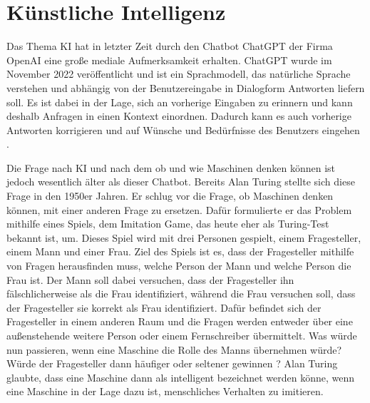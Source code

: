 \section{Künstliche Intelligenz}
\label{chap:KI}

Das Thema \ac{KI} hat in letzter Zeit durch den Chatbot ChatGPT der Firma OpenAI eine große mediale Aufmerksamkeit erhalten. 
ChatGPT wurde im November 2022 veröffentlicht und ist ein Sprachmodell, das natürliche Sprache verstehen und abhängig von der 
Benutzereingabe in Dialogform Antworten liefern soll. Es ist dabei in der Lage, sich an vorherige Eingaben zu erinnern und kann 
deshalb Anfragen in einen Kontext einordnen. Dadurch kann es auch vorherige Antworten korrigieren und auf Wünsche und Bedürfnisse 
des Benutzers eingehen \cite[]{CHATGPT}. 

Die Frage nach \ac{KI} und nach dem ob und wie Maschinen denken können ist jedoch wesentlich älter als dieser Chatbot. 
Bereits Alan Turing stellte sich diese Frage in den 1950er Jahren. Er schlug vor die Frage, ob Maschinen denken können,
mit einer anderen Frage zu ersetzen. Dafür formulierte er das Problem mithilfe eines Spiels, dem \glqq Imitation Game\grqq, 
das heute eher als Turing-Test bekannt ist, um. Dieses Spiel wird mit drei Personen gespielt, einem Fragesteller, einem Mann und 
einer Frau. Ziel des Spiels ist es, dass der Fragesteller mithilfe von Fragen herausfinden muss, welche Person der Mann und welche Person 
die Frau ist. Der Mann soll dabei versuchen, dass der Fragesteller ihn fälschlicherweise als die Frau identifiziert, während die Frau versuchen soll, 
dass der Fragesteller sie korrekt als Frau identifiziert. Dafür befindet sich der Fragesteller in einem anderen Raum und die Fragen werden entweder 
über eine außenstehende weitere Person oder einem Fernschreiber übermittelt. Was würde nun passieren, wenn eine Maschine die Rolle des Manns übernehmen würde?
Würde der Fragesteller dann häufiger oder seltener gewinnen \cite[vgl. S.433f.]{TURING}? Alan Turing glaubte, dass eine Maschine dann als
intelligent bezeichnet werden könne, wenn eine Maschine in der Lage dazu ist, menschliches Verhalten zu imitieren.


